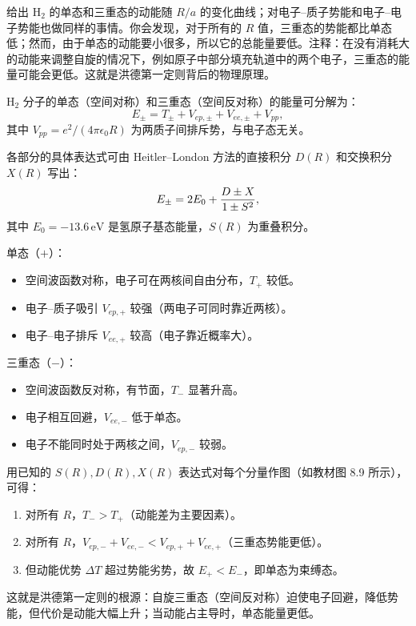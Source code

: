 \begin{question}
给出 $\mathrm{H}_2$ 的单态和三重态的动能随 $R/a$ 的变化曲线；对电子--质子势能和电子--电子势能也做同样的事情。你会发现，对于所有的 $R$ 值，三重态的势能都比单态低；然而，由于单态的动能要小很多，所以它的总能量要低。注释：在没有消耗大的动能来调整自旋的情况下，例如原子中部分填充轨道中的两个电子，三重态的能量可能会更低。这就是洪德第一定则背后的物理原理。
\end{question}
\begin{solution}
$\mathrm H_2$ 分子的单态（空间对称）和三重态（空间反对称）的能量可分解为：
\[
E_\pm=T_\pm+V_{ep,\pm}+V_{ee,\pm}+V_{pp},
\]
其中 $V_{pp}=e^2/(4\pi\epsilon_0R)$ 为两质子间排斥势，与电子态无关。

各部分的具体表达式可由 Heitler--London 方法的直接积分 $D(R)$ 和交换积分 $X(R)$ 写出：
\[
E_\pm=2E_0+{D\pm X\over1\pm S^2},
\]
其中 $E_0=-13.6\,\mathrm{eV}$ 是氢原子基态能量，$S(R)$ 为重叠积分。

单态（$+$）：
\begin{itemize}
\item 空间波函数对称，电子可在两核间自由分布，$T_+$ 较低。
\item 电子--质子吸引 $V_{ep,+}$ 较强（两电子可同时靠近两核）。
\item 电子--电子排斥 $V_{ee,+}$ 较高（电子靠近概率大）。
\end{itemize}
三重态（$-$）：
\begin{itemize}
\item 空间波函数反对称，有节面，$T_-$ 显著升高。
\item 电子相互回避，$V_{ee,-}$ 低于单态。
\item 电子不能同时处于两核之间，$V_{ep,-}$ 较弱。
\end{itemize}

用已知的 $S(R),D(R),X(R)$ 表达式对每个分量作图（如教材图 8.9 所示），可得：
\begin{enumerate}
\item 对所有 $R$，$T_- > T_+$（动能差为主要因素）。
\item 对所有 $R$，$V_{ep,-}+V_{ee,-} < V_{ep,+}+V_{ee,+}$（三重态势能更低）。
\item 但动能优势 $\Delta T$ 超过势能劣势，故 $E_+ < E_-$，即单态为束缚态。
\end{enumerate}
这就是洪德第一定则的根源：自旋三重态（空间反对称）迫使电子回避，降低势能，但代价是动能大幅上升；当动能占主导时，单态能量更低。
\end{solution}

